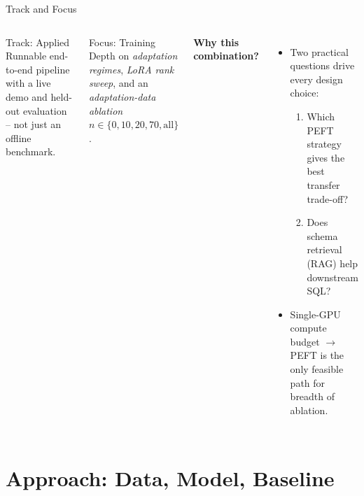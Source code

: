 \documentclass[aspectratio=169,11pt]{beamer}
\begin{document}
\begin{frame}{Track and Focus}
  \begin{columns}[T,onlytextwidth]
      \begin{alertblock}{Track: Applied}
        Runnable end-to-end pipeline with a live demo and held-out
        evaluation -- not just an offline benchmark.
      \end{alertblock}
      \begin{alertblock}{Focus: Training}
        Depth on \emph{adaptation regimes}, \emph{LoRA rank sweep}, and
        an \emph{adaptation-data ablation} \(n \in \{0, 10, 20, 70, \text{all}\}\).
      \end{alertblock}
      \textbf{Why this combination?}
      \begin{itemize}
        \item Two practical questions drive every design choice:
          \begin{enumerate}
            \item Which PEFT strategy gives the best transfer trade-off?
            \item Does schema retrieval (RAG) help downstream SQL?
          \end{enumerate}
        \item Single-GPU compute budget $\rightarrow$ PEFT is the only
              feasible path for breadth of ablation.
      \end{itemize}
  \end{columns}
\end{frame}

\section{Approach: Data, Model, Baseline}
\end{document}
